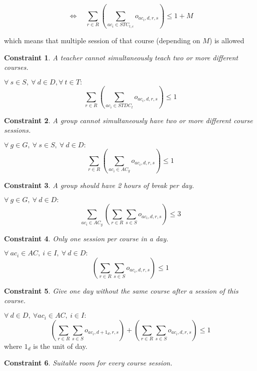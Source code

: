 \documentclass[12pt,a4paper]{article}
\newtheorem{theorem}{Constraint}
\begin{document}
\[
\Longleftrightarrow \quad
\sum_{r\in R}\left(\sum_{ac_{i} \in STC_{t,c}}{o_{ac_{i}, d, r, s}}\right) \leq 1 + M
\]

which means that multiple session of that course (depending on $M$) is allowed

\begin{theorem}
A teacher cannot simultaneously teach two or more different courses.
\end{theorem}
$
\forall \ s \in S,\ \forall \ d \in D, \forall \ t \in T:
$
\begin{equation}
\sum_{r\in R}\left(\sum_{ac_i \in STDC_{t}}{o_{ac_{i}, d, r, s}}\right) \leq 1
\end{equation}

\begin{theorem}
A group cannot simultaneously have two or more different course sessions.
\end{theorem}
$
\forall \ g \in G, \ \forall	\ s \in S, \ \forall \ d \in D :
$
\begin{equation}
\sum_{r\in R}\left(\sum_{ac_i \in AC_g}{o_{ac_{i}, d, r, s}}\right) \leq 1
\end{equation}
\begin{theorem}
A group should have 2 hours of break per day.
\end{theorem}
$
\forall \ g \in G, \ \forall \ d \in D :
$
\begin{equation}
\sum_{ac_{i} \in AC_{g}}\left(\sum_{r\in R}{\sum_{s \in S}{o_{ac_{i}, d, r, s}}}\right) \leq 3
\end{equation}
\begin{theorem}
Only one session per course in a day.
\end{theorem}
$
\forall \ ac_i \in AC,\ i \in I, \ \forall \ d \in D :
$
\begin{equation}
\left(\sum_{r\in R}{\sum_{s \in S}{o_{ac_{i}, d, r, s}}}\right) \leq 1
\end{equation}
\begin{theorem}
Give one day without the same course after a session of this course.
\end{theorem}
$
\forall \ d \in D, \ \forall ac_i \in AC, \ i \in I:
$
\begin{equation}
\left(\sum_{r\in R}{\sum_{s \in S}{o_{ac_{i}, d + 1_d, r, s}}}\right) + \left(\sum_{r\in R}{\sum_{s \in S}{o_{ac_{i}, d, r, s}}}\right) \leq 1
\end{equation}
where $1_d$ is the unit of day.

\begin{theorem}
Suitable room for every course session.
\end{theorem}
\end{document}
